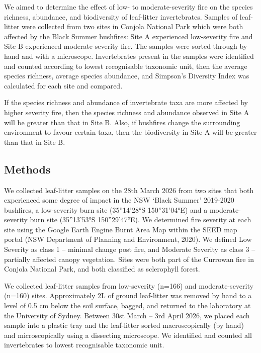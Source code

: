 We aimed to determine the effect of low- to moderate-severity fire on the species richness, abundance, and biodiversity of leaf-litter invertebrates.
Samples of leaf-litter were collected from two sites in Conjola National Park which were both affected by the Black Summer bushfires: Site A experienced low-severity fire and Site B experienced moderate-severity fire.
The samples were sorted through by hand and with a microscope.
Invertebrates present in the samples were identified and counted according to lowest recognisable taxonomic unit, then the average species richness, average species abundance, and Simpson's Diversity Index was calculated for each site and compared.

If the species richness and abundance of invertebrate taxa are more affected by higher severity fire, then the species richness and abundance observed in Site A will be greater than that in Site B. Also, if bushfires change the surrounding environment to favour certain taxa, then the biodiversity in Site A will be greater than that in Site B.

\break

\subsection{Methods}

We collected leaf-litter samples on the 28th March 2026 from two sites that both experienced some degree of impact in the NSW ‘Black Summer’ 2019-2020 bushfires, a low-severity burn site (35”14’28°S 150”31’04°E) and a moderate- severity burn site (35”13’53°S 150”29’47°E). We determined fire severity at each site using the Google Earth Engine Burnt Area Map within the SEED map portal (NSW Department of Planning and Environment, 2020). We defined Low Severity as class 1 – minimal change post fire, and Moderate Severity as class 3 – partially affected canopy vegetation. Sites were both part of the Currowan fire in Conjola National Park, and both classified as sclerophyll forest.

We collected leaf-litter samples from low-severity (n=166) and moderate-severity (n=160) sites. Approximately 2L of ground leaf-litter was removed by hand to a level of 0.5 cm below the soil surface, bagged, and returned to the laboratory at the University of Sydney. Between 30st March – 3rd April 2026, we placed each sample into a plastic tray and the leaf-litter sorted macroscopically (by hand) and microscopically using a dissecting microscope. We identified and counted all invertebrates to lowest recognisable taxonomic unit.

